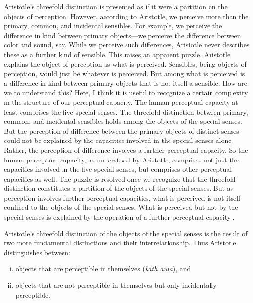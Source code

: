Aristotle's threefold distinction is presented as if it were a partition on the objects of perception. However, according to Aristotle, we perceive more than the primary, common, and incidental sensibles. For example, we perceive the difference in kind between primary objects---we perceive the difference between color and sound, say. While we perceive such differences, Aristotle never describes these as a further kind of sensible. This raises an apparent puzzle. Aristotle explains the object of perception as what is perceived. Sensibles, being objects of perception, would just be whatever is perceived. But among what is perceived is a difference in kind between primary objects that is not itself a sensible. How are we to understand this? Here, I think it is useful to recognize a certain complexity in the structure of our perceptual capacity. The human perceptual capacity at least comprises the five special senses. The threefold distinction between primary, common, and incidental sensibles holds among the objects of the special senses. But the perception of difference between the primary objects of distinct senses could not be explained by the capacities involved in the special senses alone. Rather, the perception of difference involves a further perceptual capacity. So the human perceptual capacity, as understood by Aristotle, comprises not just the capacities involved in the five special senses, but comprises other perceptual capacities as well. The puzzle is resolved once we recognize that the threefold distinction constitutes a partition of the objects of the special senses. But as perception involves further perceptual capacities, what is perceived is not itself confined to the objects of the special senses. What is perceived but not by the special senses is explained by the operation of a further perceptual capacity \citep[see][33--34]{Gregoric:2007yq}.

Aristotle's threefold distinction of the objects of the special senses is the result of two more fundamental distinctions and their interrelationship. Thus Aristotle distinguishes between:
\begin{enumerate}[(i)]
	\item objects that are perceptible in themselves (\emph{kath auta}), and
	\item objects that are not perceptible in themselves but only incidentally perceptible.
\end{enumerate}


